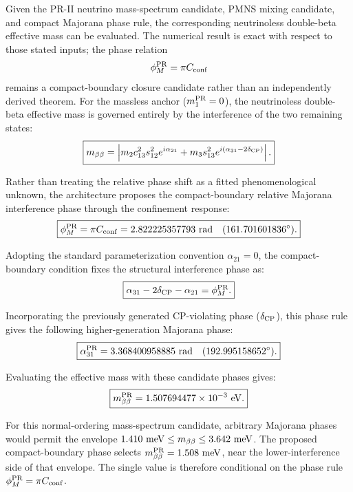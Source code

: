 \documentclass[11pt]{article}
\begin{document}
Given the PR-II neutrino mass-spectrum candidate, PMNS mixing candidate, and compact Majorana phase rule, the corresponding neutrinoless double-beta effective mass can be evaluated. The numerical result is exact with respect to those stated inputs; the phase relation
\begin{equation}
\phi_M^{\rm PR}
=
\pi C_{\rm conf}
\end{equation}
remains a compact-boundary closure candidate rather than an independently derived theorem. For the massless anchor ($m_1^{\rm PR}=0$), the neutrinoless double-beta effective mass \cite{Majorana1937, SchechterValle1982} is governed entirely by the interference of the two remaining states:
\begin{equation}
\boxed{
m_{\beta\beta}
=
\left|
m_2c_{13}^2s_{12}^2e^{i\alpha_{21}}
+
m_3s_{13}^2e^{i(\alpha_{31}-2\delta_{\rm CP})}
\right|.
}
\end{equation}

Rather than treating the relative phase shift as a fitted phenomenological unknown, the architecture proposes the compact-boundary relative Majorana interference phase through the confinement response:
\begin{equation}
\boxed{
\phi_M^{\rm PR}
=
\pi C_{\rm conf}
=
2.822225357793\ {\rm rad}
\quad
(161.701601836^\circ).
}
\end{equation}

Adopting the standard parameterization convention $\alpha_{21}=0$, the compact-boundary condition fixes the structural interference phase as:
\begin{equation}
\boxed{
\alpha_{31}-2\delta_{\rm CP}-\alpha_{21}
=
\phi_M^{\rm PR}.
}
\end{equation}

Incorporating the previously generated CP-violating phase ($\delta_{\rm CP}$), this phase rule gives the following higher-generation Majorana phase:
\begin{equation}
\boxed{
\alpha_{31}^{\rm PR}
=
3.368400958885\ {\rm rad}
\quad
(192.995158652^\circ).
}
\end{equation}

Evaluating the effective mass with these candidate phases gives:
\begin{equation}
\boxed{
m_{\beta\beta}^{\rm PR}
=
1.507694477\times10^{-3}\ {\rm eV}.
}
\end{equation}

For this normal-ordering mass-spectrum candidate, arbitrary Majorana \cite{MakiNakagawaSakata1962} phases would permit the envelope
$1.410\ {\rm meV}\leq m_{\beta\beta} \leq 3.642\ {\rm meV}$. The proposed compact-boundary phase selects $m_{\beta\beta}^{\rm PR} = 1.508\ {\rm meV}$, near the lower-interference side of that envelope. The single value is therefore conditional on the phase rule $\phi_M^{\rm PR}=\pi C_{\rm conf}$.
\end{document}
